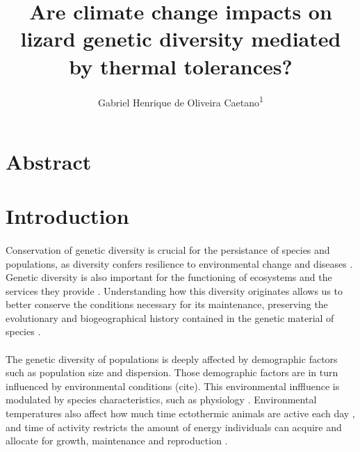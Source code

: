 \documentclass{article}
\title{\textbf{Are climate change impacts on lizard genetic diversity mediated by thermal tolerances?}}
\author{Gabriel Henrique de Oliveira Caetano\textsuperscript{1}}
\affil{\textsuperscript{1}Universidade de Bras\'ilia}
\date{\vspace{-5ex}}
\begin{document}
	
	\maketitle
	
{\raggedright

\section{Abstract}

\section{Introduction}

\paragraph{} Conservation of genetic diversity is crucial for the persistance of species and populations, as diversity confers resilience to environmental change \cite{frankham2005genetics} and diseases \cite{king2012does}. Genetic diversity is also important for the functioning of ecosystems and the services they provide \cite{faith2010evosystem, srivastava2012phylogenetic, rosauer2016phylogeography}. Understanding how this diversity originates allows us to better conserve the conditions necessary for its maintenance, preserving the evolutionary and biogeographical history contained in the genetic material of species \cite{purvis2000nonrandom, davies2011phylogenetic}.

\paragraph{} The genetic diversity of populations is deeply affected by demographic factors such as population size \cite{kimura1979neutral, leffler2012revisiting, hague2016does} and dispersion\cite{tigano2016genomics}. Those demographic factors are in turn influenced by environmental conditions (cite). This environmental inffluence is modulated by species characteristics, such as physiology \cite{huey1991physiological, walther2002ecological, kearney2009mechanistic}. Environmental temperatures also affect how much time ectothermic animals are active each day \cite{grant1988thermally, adolph1993temperature, sinervo1994growth}, and time of activity restricts the amount of energy individuals can acquire and allocate for growth, maintenance and reproduction \cite{porter1973behavioral, sinervo1994growth, kearney2009mechanistic}.

}
\end{document}
